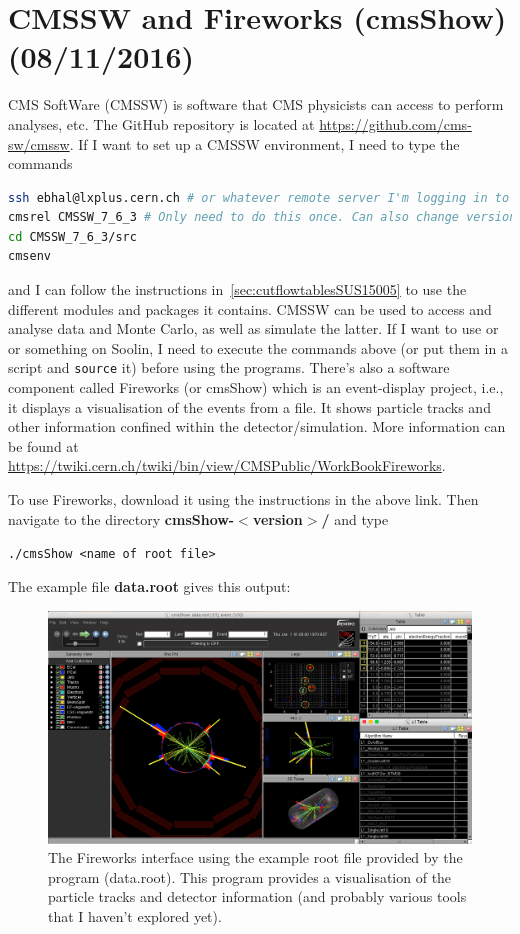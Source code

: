 \newpage
\chapter{CMSSW and Fireworks (cmsShow) (08/11/2016)}
\label{sec:fireworks}

CMS SoftWare (CMSSW) is software that CMS physicists can access to perform analyses, etc. The GitHub repository is located at \url{https://github.com/cms-sw/cmssw}. If I want to set up a CMSSW environment, I need to type the commands

\begin{lstlisting}[belowskip=-0.7cm, language=sh, numbers=none]
ssh ebhal@lxplus.cern.ch # or whatever remote server I'm logging in to
cmsrel CMSSW_7_6_3 # Only need to do this once. Can also change version I'm working with
cd CMSSW_7_6_3/src
cmsenv
\end{lstlisting}

and I can follow the instructions in~\ref{sec:cutflowtablesSUS15005} to use the different modules and packages it contains. CMSSW can be used to access and analyse data and Monte Carlo, as well as simulate the latter. If I want to use \madgraph or \madanalysis or something on Soolin, I need to execute the commands above (or put them in a script and \verb!source! it) before using the programs. There's also a software component called Fireworks (or cmsShow) which is an event-display project, i.e., it displays a visualisation of the events from a \ROOT file. It shows particle tracks and other information confined within the detector/simulation. More information can be found at \url{https://twiki.cern.ch/twiki/bin/view/CMSPublic/WorkBookFireworks}.

To use Fireworks, download it using the instructions in the above link. Then navigate to the directory \textbf{cmsShow-$<$version$>$/} and type

\verb!./cmsShow <name of root file>!

The example file \textbf{data.root} gives this output:

\begin{figure}[H]
\centering
\includegraphics[width=\textwidth]{./sec12/fireworksexample.png}
\caption{The Fireworks interface using the example root file provided by the program (data.root). This program provides a visualisation of the particle tracks and detector information (and probably various tools that I haven't explored yet).}
\end{figure}

